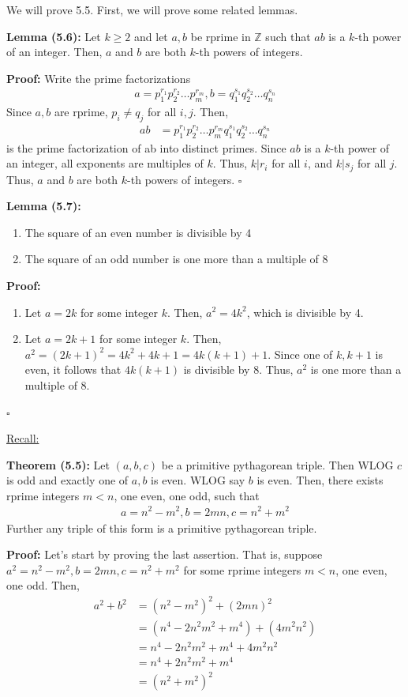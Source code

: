\documentclass{article}
\newcommand*{\qed}{\hfill$\square$}%
\newcommand*{\zz}{\mathbb{Z}}%
\begin{document}
We will prove 5.5. First, we will prove some related lemmas.

\textbf{Lemma (5.6):} Let $k\geq 2$ and let $a,b$ be rprime in $\zz$ such that $ab$ is a $k$-th power of an integer. Then, $a$ and $b$ are both $k$-th powers of integers.

\textbf{Proof:} Write the prime factorizations \begin{align*}
    a=p_1^{r_1}p_2^{r_2}\dots p_m^{r_m}, b=q_1^{s_1}q_2^{s_2}\dots q_n^{s_n}
\end{align*}Since $a,b$ are rprime, $p_i\neq q_j$ for all $i,j$. Then, \begin{align*}
    ab&=p_1^{r_1}p_2^{r_2}\dots p_m^{r_m}q_1^{s_1}q_2^{s_2}\dots q_n^{s_n}
\end{align*}is the prime factorization of ab into distinct primes. Since $ab$ is a $k$-th power of an integer, all exponents are multiples of $k$. Thus, $k|r_i$ for all $i$, and $k|s_j$ for all $j$. Thus, $a$ and $b$ are both $k$-th powers of integers. \qed

\textbf{Lemma (5.7):} \begin{enumerate}
    \item The square of an even number is divisible by 4
    \item The square of an odd number is one more than a multiple of 8
\end{enumerate}

\textbf{Proof:} \begin{enumerate}
    \item Let $a=2k$ for some integer $k$. Then, $a^2=4k^2$, which is divisible by 4.
    \item Let $a=2k+1$ for some integer $k$. Then, $a^2=(2k+1)^2=4k^2+4k+1=4k(k+1)+1$. Since one of $k,k+1$ is even, it follows that $4k(k+1)$ is divisible by 8. Thus, $a^2$ is one more than a multiple of 8.
\end{enumerate}\qed

\underline{Recall:}

\textbf{Theorem (5.5):} Let $(a,b,c)$ be a primitive pythagorean triple. Then WLOG $c$ is odd and exactly one of $a,b$ is even. WLOG say $b$ is even. Then, there exists rprime integers $m<n$, one even, one odd, such that \begin{align*}
    a=n^2-m^2, b=2mn, c=n^2+m^2
\end{align*}Further any triple of this form is a primitive pythagorean triple.

\textbf{Proof:} Let's start by proving the last assertion. That is, suppose $a^2=n^2-m^2, b=2mn, c=n^2+m^2$ for some rprime integers $m<n$, one even, one odd. Then, \begin{align*}
    a^2+b^2&=(n^2-m^2)^2+(2mn)^2 \\
        &=(n^4-2n^2m^2+m^4)+(4m^2n^2)\\
        &=n^4-2n^2m^2+m^4+4m^2n^2\\
        &=n^4+2n^2m^2+m^4 \\
        &=(n^2+m^2)^2 \\
\end{align*}
\end{document}
